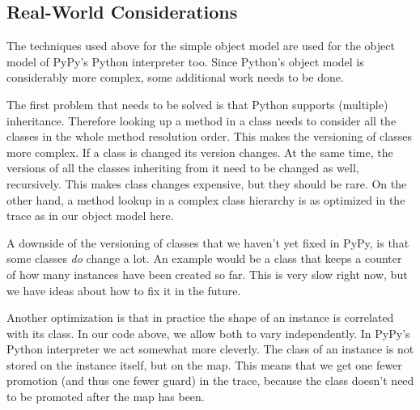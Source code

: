 \documentclass{sigplanconf}
\begin{document}

\subsection{Real-World Considerations}

The techniques used above for the simple object model are used for the object
model of PyPy's Python interpreter too. Since Python's object model is
considerably more complex, some additional work needs to be done.

The first problem that needs to be solved is that Python supports (multiple)
inheritance. Therefore looking up a method in a class needs to consider all the
classes in the
whole method resolution order. This makes the versioning of classes more
complex. If a class is changed its version changes. At the same time, the
versions of all the classes inheriting from it need to be changed as well,
recursively. This makes class changes expensive, but they should be rare.  On the
other hand, a method lookup in a complex class hierarchy is as optimized in the
trace as in our object model here.

A downside of the versioning of classes that we haven't yet fixed in PyPy, is
that some classes \emph{do} change a lot. An example would be a class that keeps a
counter of how many instances have been created so far. This is very slow right
now, but we have ideas about how to fix it in the future.

Another optimization is that in practice the shape of an instance is correlated
with its class. In our code above, we allow both to vary independently.
In PyPy's Python interpreter we act somewhat more cleverly. The class of
an instance is not stored on the instance itself, but on the map. This means
that we get one fewer promotion (and thus one fewer guard) in the trace,
because the class doesn't need to
be promoted after the map has been.



%
%
\end{document}
